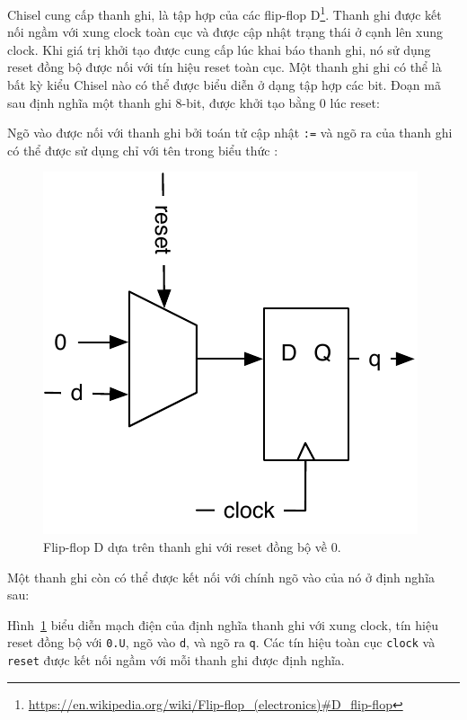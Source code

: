 \documentclass[%
    10pt,
    headinclude, footexclude,
    openright, %
    notitlepage,
    cleardoubleempty,
    headsepline,
    pointlessnumbers,
    bibtotoc, idxtotoc,
    ]{scrbook}
\newcommand{\code}[1]{{\small{\texttt{#1}}}}
\newcommand{\scale}{0.7}
\newcommand{\myref}[2]{\href{#1}{#2}}
\renewcommand{\myref}[2]{{#2}{\footnote{\url{#1}}}}
\begin{document}
Chisel cung cấp thanh ghi, là tập hợp của các 
\myref{https://en.wikipedia.org/wiki/Flip-flop\_(electronics)\#D\_flip-flop}{flip-flop D}.
Thanh ghi được kết nối ngầm với xung clock toàn cục và được cập nhật trạng thái ở cạnh lên xung clock.
Khi giá trị khởi tạo được cung cấp lúc khai báo thanh ghi, nó sử dụng reset đồng bộ được nối với tín hiệu reset toàn cục.
Một thanh ghi ghi có thể là bất kỳ kiểu Chisel nào có thể được biểu diễn ở dạng tập hợp các bit.
Đoạn mã sau định nghĩa một thanh ghi 8-bit, được khởi tạo bằng 0 lúc reset:


\noindent Ngõ vào được nối với thanh ghi bởi toán tử cập nhật \code{:=} và
ngõ ra của thanh ghi có thể được sử dụng chỉ với tên trong biểu thức :


\begin{figure}
  \centering
  \includegraphics[scale=\scale]{figures/register-reset-0}
  \caption{Flip-flop D dựa trên thanh ghi với reset đồng bộ về 0.}
  \label{fig:register-reset-0}
\end{figure}

\noindent Một thanh ghi còn có thể được kết nối với chính ngõ vào của nó ở định nghĩa sau:


Hình~\ref{fig:register-reset-0} biểu diễn mạch điện của định nghĩa thanh ghi với xung clock, tín hiệu reset đồng bộ với \code{0.U}, ngõ vào \code{d}, và ngõ ra \code{q}.
Các tín hiệu toàn cục \code{clock} và \code{reset} được kết nối ngầm với mỗi thanh ghi được định nghĩa.
\end{document}
